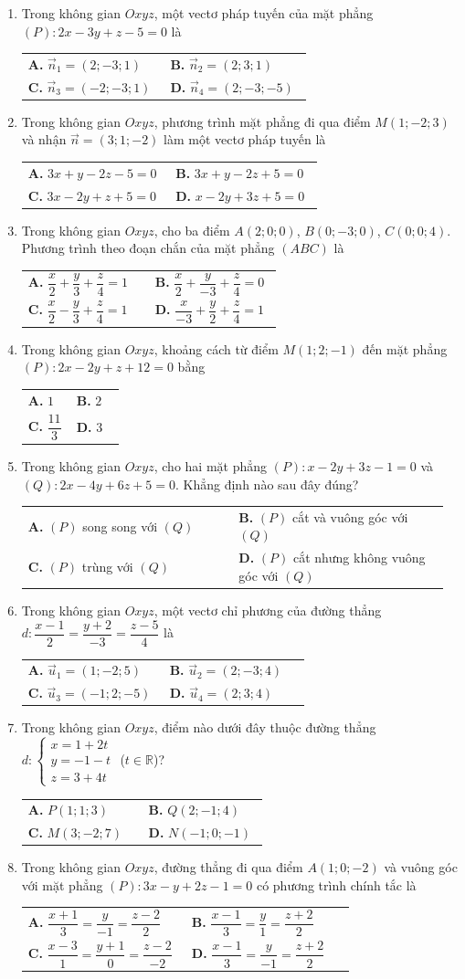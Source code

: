 \documentclass[12pt,a4paper]{article}
\makeatletter
\newcommand{\bonpa}[4]{\par\nobreak\smallskip\nobreak\noindent
\begin{tabular}{@{}p{0.48\linewidth}p{0.48\linewidth}@{}}
\textbf{A.} #1 & \textbf{B.} #2\\[8pt]
\textbf{C.} #3 & \textbf{D.} #4\end{tabular}}
\makeatother
\begin{document}
\begin{enumerate}
\item Trong không gian $Oxyz$, một vectơ pháp tuyến của mặt phẳng $(P): 2x - 3y + z - 5 = 0$ là
\bonpa{$\vec{n}_1 = (2; -3; 1)$}{$\vec{n}_2 = (2; 3; 1)$}{$\vec{n}_3 = (-2; -3; 1)$}{$\vec{n}_4 = (2; -3; -5)$}

\item Trong không gian $Oxyz$, phương trình mặt phẳng đi qua điểm $M(1; -2; 3)$ và nhận $\vec{n} = (3; 1; -2)$ làm một vectơ pháp tuyến là
\bonpa{$3x + y - 2z - 5 = 0$}{$3x + y - 2z + 5 = 0$}{$3x - 2y + z + 5 = 0$}{$x - 2y + 3z + 5 = 0$}

\item Trong không gian $Oxyz$, cho ba điểm $A(2; 0; 0)$, $B(0; -3; 0)$, $C(0; 0; 4)$. Phương trình theo đoạn chắn của mặt phẳng $(ABC)$ là
\bonpa{$\dfrac{x}{2} + \dfrac{y}{3} + \dfrac{z}{4} = 1$}{$\dfrac{x}{2} + \dfrac{y}{-3} + \dfrac{z}{4} = 0$}{$\dfrac{x}{2} - \dfrac{y}{3} + \dfrac{z}{4} = 1$}{$\dfrac{x}{-3} + \dfrac{y}{2} + \dfrac{z}{4} = 1$}

\item Trong không gian $Oxyz$, khoảng cách từ điểm $M(1; 2; -1)$ đến mặt phẳng $(P): 2x - 2y + z + 12 = 0$ bằng
\bonpa{$1$}{$2$}{$\dfrac{11}{3}$}{$3$}

\item Trong không gian $Oxyz$, cho hai mặt phẳng $(P): x - 2y + 3z - 1 = 0$ và $(Q): 2x - 4y + 6z + 5 = 0$. Khẳng định nào sau đây đúng?
\bonpa{$(P)$ song song với $(Q)$}{$(P)$ cắt và vuông góc với $(Q)$}{$(P)$ trùng với $(Q)$}{$(P)$ cắt nhưng không vuông góc với $(Q)$}

\item Trong không gian $Oxyz$, một vectơ chỉ phương của đường thẳng $d: \dfrac{x-1}{2} = \dfrac{y+2}{-3} = \dfrac{z-5}{4}$ là
\bonpa{$\vec{u}_1 = (1; -2; 5)$}{$\vec{u}_2 = (2; -3; 4)$}{$\vec{u}_3 = (-1; 2; -5)$}{$\vec{u}_4 = (2; 3; 4)$}

\item Trong không gian $Oxyz$, điểm nào dưới đây thuộc đường thẳng $d: \begin{cases} x = 1 + 2t \\ y = -1 - t \\ z = 3 + 4t \end{cases}$ ($t \in \mathbb{R}$)?
\bonpa{$P(1; 1; 3)$}{$Q(2; -1; 4)$}{$M(3; -2; 7)$}{$N(-1; 0; -1)$}

\item Trong không gian $Oxyz$, đường thẳng đi qua điểm $A(1; 0; -2)$ và vuông góc với mặt phẳng $(P): 3x - y + 2z - 1 = 0$ có phương trình chính tắc là
\bonpa{$\dfrac{x+1}{3} = \dfrac{y}{-1} = \dfrac{z-2}{2}$}{$\dfrac{x-1}{3} = \dfrac{y}{1} = \dfrac{z+2}{2}$}{$\dfrac{x-3}{1} = \dfrac{y+1}{0} = \dfrac{z-2}{-2}$}{$\dfrac{x-1}{3} = \dfrac{y}{-1} = \dfrac{z+2}{2}$}


\end{enumerate}
\end{document}
